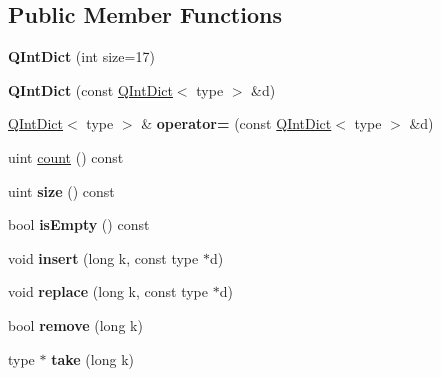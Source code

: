 \subsection*{Public Member Functions}
\begin{DoxyCompactItemize}
\item 
\mbox{\label{class_q_int_dict_a8e08f6bd27944aba2448a7d46599344e}} 
{\bfseries Q\+Int\+Dict} (int size=17)
\item 
\mbox{\label{class_q_int_dict_af742692f072b38878864d47294cc82f0}} 
{\bfseries Q\+Int\+Dict} (const \mbox{\hyperlink{class_q_int_dict}{Q\+Int\+Dict}}$<$ type $>$ \&d)
\item 
\mbox{\label{class_q_int_dict_a4244a6c344ab404ca576d343ae6613fb}} 
\mbox{\hyperlink{class_q_int_dict}{Q\+Int\+Dict}}$<$ type $>$ \& {\bfseries operator=} (const \mbox{\hyperlink{class_q_int_dict}{Q\+Int\+Dict}}$<$ type $>$ \&d)
\item 
uint \mbox{\hyperlink{class_q_int_dict_acba9c2286ecaab46e0231e145ef5e471}{count}} () const
\item 
\mbox{\label{class_q_int_dict_a45d9b5244cd17b50ccb61564693e6c3d}} 
uint {\bfseries size} () const
\item 
\mbox{\label{class_q_int_dict_a3eb4a75ac5b10a1a0625784124e16d2d}} 
bool {\bfseries is\+Empty} () const
\item 
\mbox{\label{class_q_int_dict_a35741cb744a4a35802f63157a8ca35d8}} 
void {\bfseries insert} (long k, const type $\ast$d)
\item 
\mbox{\label{class_q_int_dict_a799b08f520ac7f188d8d602cc9ecdeb8}} 
void {\bfseries replace} (long k, const type $\ast$d)
\item 
\mbox{\label{class_q_int_dict_aac763816e720327cb6f5a66817bf2484}} 
bool {\bfseries remove} (long k)
\item 
\mbox{\label{class_q_int_dict_ae6e5a142ad8e220108189547163c488d}} 
type $\ast$ {\bfseries take} (long k)
\item 
\mbox{\label{class_q_int_dict_a5e91883c9f5aba671e04b0fb8a0f80de}} 

\end{DoxyCompactItemize}
